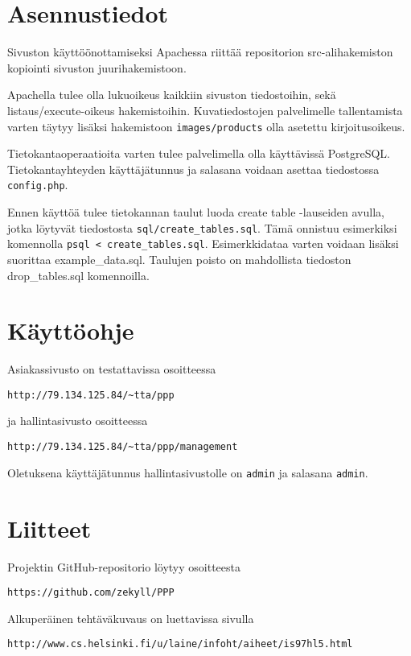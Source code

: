 \documentclass[a4paper, 12pt, finnish]{article}
\begin{document}
\section{Asennustiedot}

Sivuston käyttöönottamiseksi Apachessa riittää repositorion src-alihakemiston kopiointi sivuston juurihakemistoon.

Apachella tulee olla lukuoikeus kaikkiin sivuston tiedostoihin, sekä listaus/execute-oikeus hakemistoihin. Kuvatiedostojen palvelimelle tallentamista varten täytyy lisäksi hakemistoon \texttt{images/products} olla asetettu kirjoitusoikeus.

Tietokantaoperaatioita varten tulee palvelimella olla käyttävissä PostgreSQL. Tietokantayhteyden käyttäjätunnus ja salasana voidaan asettaa tiedostossa \texttt{config.php}.

Ennen käyttöä tulee tietokannan taulut luoda create table -lauseiden avulla, jotka löytyvät tiedostosta \texttt{sql/create\_tables.sql}. Tämä onnistuu esimerkiksi komennolla \texttt{psql < create\_tables.sql}. Esimerkkidataa varten voidaan lisäksi suorittaa example\_data.sql. Taulujen poisto on mahdollista tiedoston drop\_tables.sql komennoilla.

\section{Käyttöohje}

Asiakassivusto on testattavissa osoitteessa

\begin{verbatim}
http://79.134.125.84/~tta/ppp
\end{verbatim}

ja hallintasivusto osoitteessa

\begin{verbatim}
http://79.134.125.84/~tta/ppp/management
\end{verbatim}

Oletuksena käyttäjätunnus hallintasivustolle on \texttt{admin} ja salasana \texttt{admin}.


\section{Liitteet}

Projektin GitHub-repositorio löytyy osoitteesta

\begin{verbatim}
https://github.com/zekyll/PPP
\end{verbatim}

Alkuperäinen tehtäväkuvaus on luettavissa sivulla

\begin{verbatim}
http://www.cs.helsinki.fi/u/laine/infoht/aiheet/is97hl5.html
\end{verbatim}
\end{document}
